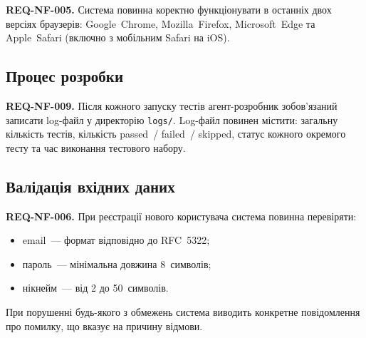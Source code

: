 \textbf{REQ-NF-005.} Система повинна коректно функціонувати в останніх двох версіях браузерів: Google~Chrome, Mozilla~Firefox, Microsoft~Edge та Apple~Safari (включно з мобільним Safari на iOS). 

\subsection{Процес розробки}

\textbf{REQ-NF-009.} Після кожного запуску тестів агент-розробник зобов'язаний записати log-файл у директорію \texttt{logs/}. Log-файл повинен містити: загальну кількість тестів, кількість passed~/ failed~/ skipped, статус кожного окремого тесту та час виконання тестового набору. 

\subsection{Валідація вхідних даних}

\textbf{REQ-NF-006.} При реєстрації нового користувача система повинна перевіряти:
\begin{itemize}
  \item email~--- формат відповідно до RFC~5322;
  \item пароль~--- мінімальна довжина 8~символів;
  \item нікнейм~--- від 2 до 50~символів.
\end{itemize}
При порушенні будь-якого з обмежень система виводить конкретне повідомлення про помилку, що вказує на причину відмови. 

